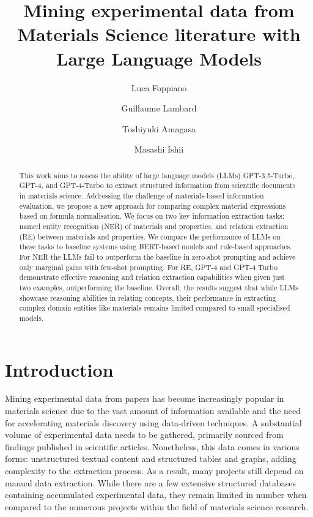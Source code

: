 \documentclass[a4paper]{article}
\title{Mining experimental data from Materials Science literature with Large Language Models}
\author[1,2]{Luca Foppiano}
\author[1]{Guillaume Lambard}
\author[2]{Toshiyuki Amagasa}
\author[1]{Masashi Ishii}
\affil[1]{Data-driven Materials Research Field, Centre for Basic Research on Materials, NIMS, JP}
\affil[2]{Knowledge and Data Engineering, Centre for Computational Sciences, University of Tsukuba}
\begin{document}
\maketitle

\begin{abstract}
This work aims to assess the ability of large language models (LLMs) GPT-3.5-Turbo, GPT-4, and GPT-4-Turbo to extract structured information from scientific documents in materials science. 
Addressing the challenge of materials-based information evaluation, we propose a new approach for comparing complex material expressions based on formula normalisation. 
We focus on two key information extraction tasks: named entity recognition (NER) of materials and properties, and relation extraction (RE) between materials and properties. 
We compare the performance of LLMs on these tasks to baseline systems using BERT-based models and rule-based approaches. 
For NER the LLMs fail to outperform the baseline in zero-shot prompting and achieve only marginal gains with few-shot prompting. For RE, GPT-4 and GPT-4 Turbo demonstrate effective reasoning and relation extraction capabilities when given just two examples, outperforming the baseline. 
Overall, the results suggest that while LLMs showcase reasoning abilities in relating concepts, their performance in extracting complex domain entities like materials remains limited compared to small specialised models. 
\end{abstract}

\section{Introduction}

Mining experimental data from papers has become increasingly popular in materials science due to the vast amount of information available and the need for accelerating materials discovery using data-driven techniques.
A substantial volume of experimental data needs to be gathered, primarily sourced from findings published in scientific articles.
Nonetheless, this data comes in various forms: unstructured textual content and structured tables and graphs, adding complexity to the extraction process. 
As a result, many projects still depend on manual data extraction.
While there are a few extensive structured databases containing accumulated experimental data, they remain limited in number when compared to the numerous projects within the field of materials science research.
\end{document}
